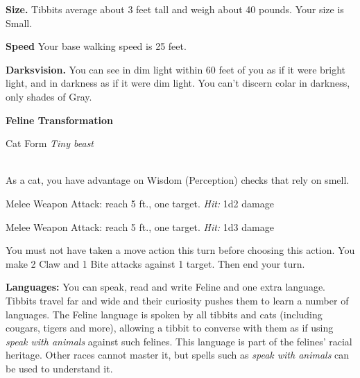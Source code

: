 \textbf{Size.} Tibbits average about 3 feet tall and weigh about 40 pounds. Your size is Small.

\textbf{Speed} Your base walking speed is 25 feet.

\textbf{Darksvision.} You can see in dim light within 60 feet of you as if it were bright light, and in darkness as if it were dim light. You can't discern colar in 
darkness, only shades of Gray. 

\textbf{Feline Transformation}


\begin{monsterbox}{Cat Form}
	\textit{Tiny beast}\\
	\hline
	\basics[%
	armorclass = As normal but note extra dex from cat form,
	hitpoints  = -,
	speed      = {40 ft, climb 30 ft}
	]
	\hline
	\stats[
	STR = -8 (Minimum 3),
	DEX = +2,
	CON = -,
	INT = -,
	WIS = -,
	CHA = -
	]
	\hline
	\details[
	skills = {Perception + 3, Stealth + 4},
	languages = {Only Feline}
	]
	\hline \\[1mm]
	\begin{monsteraction}
		As a cat, you have advantage on Wisdom (Perception) checks that rely on smell.
	\end{monsteraction}
	\begin{monsteraction}[Claws]
		Melee Weapon Attack: reach 5 ft., one target.
		\textit{Hit:} 1d2 damage
	\end{monsteraction}

\begin{monsteraction}[Bite]
		Melee Weapon Attack: reach 5 ft., one target.
		\textit{Hit:} 1d3 damage
	\end{monsteraction}

	\begin{monsteraction}[Frenzy]
    You must not have taken a move action this turn before choosing this action. You make 2 Claw and 1 Bite attacks against 1 target. Then end your turn.
	\end{monsteraction}
\end{monsterbox}

\textbf{Languages:} You can speak, read and write Feline and one extra language. Tibbits travel far and wide and their curiosity pushes them to learn a number of languages. The Feline language is spoken by all tibbits and cats (including cougars, tigers and more), allowing a tibbit to converse with them as if using \textit{speak with animals} against such felines. This language is part of the felines' racial heritage. Other races cannot master it, but spells such as \textit{speak with animals} can be used to understand it.
  